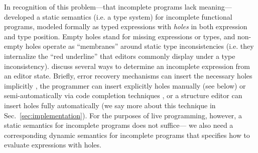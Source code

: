
In recognition of this problem---that incomplete programs lack meaning---%
\citet{popl-paper} developed a static semantics (i.e. a type system) for incomplete 
functional programs, modeled formally as typed expressions with \emph{holes} in 
both expression and type position. 
Empty holes stand for missing expressions or types,
and non-empty holes operate as ``membranes'' around static type inconsistencies 
(i.e. they internalize the ``red underline'' that editors commonly display under a type inconsistency).
\citet{popl-paper,HazelnutSNAPL} discuss several ways to determine an incomplete expression from an editor state. 
Briefly, error recovery mechanisms can insert the necessary holes implicitly \cite{DBLP:journals/siamcomp/AhoP72,charles1991practical,graham1979practical,DBLP:conf/oopsla/KatsJNV09,DBLP:conf/oopsla/KatsV10},
the programmer can insert explicitly holes manually (see below) 
or semi-automatically via code completion techniques \cite{Amorim2016}, 
or a structure editor can insert holes fully automatically \cite{popl-paper} (we say more about this technique in Sec.~\ref{sec:implementation}).
%
For the purposes of live programming, however, a static semantics for incomplete programs does not suffice---%
we also need a corresponding dynamic semantics for incomplete programs that specifies how to evaluate expressions with holes.
%

